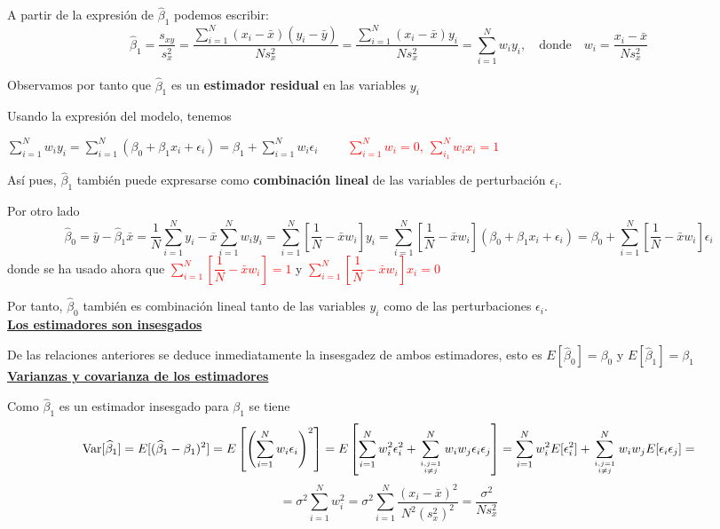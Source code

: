 \documentclass[10pt,a4paper]{book}
\begin{document}
A partir de la expresión de $\widehat{\beta}_1$ podemos escribir: $$\widehat{\beta}_1=\dfrac{s_{xy}}{s^2_x}=\dfrac{\displaystyle\sum^N_{i=1}(x_i-\bar{x})(y_i-\bar{y})}{Ns^2_x}=\dfrac{\displaystyle\sum^N_{i=1}(x_i-\bar{x})y_i}{Ns^2_x}=\displaystyle\sum^N_{i=1}w_iy_i,\quad \mathrm{donde}\quad w_i=\dfrac{x_i-\bar{x}}{Ns^2_x}$$

Observamos por tanto que $\widehat{\beta}_1$ es un \textbf{estimador residual} en las variables $y_i$

Usando la expresión del modelo, tenemos 
\begin{center}
$\displaystyle\sum^N_{i=1}w_iy_i=\displaystyle\sum^N_{i=1}(\beta_0+\beta_1x_i+\epsilon_i)=\beta_1+\displaystyle\sum^N_{i=1}w_i\epsilon_i\qquad$ \textcolor{red}{$\displaystyle\sum^N_{i=1}w_i=0,\: \displaystyle\sum^N_{i_1}w_ix_i=1$}
\end{center}

Así pues, $\widehat{\beta}_1$ también puede expresarse como \textbf{combinación lineal} de las variables de perturbación $\epsilon_i$.

Por otro lado $$\widehat{\beta}_0=\bar{y}-\widehat{\beta}_1\bar{x}=\dfrac{1}{N}\sum^N_{i=1}y_i-\bar{x}\sum^N_{i=1}w_iy_i=\sum^N_{i=1}\left[\dfrac{1}{N}-\bar{x}w_i\right] y_i=\sum^N_{i=1}\left[\dfrac{1}{N}-\bar{x}w_i\right] (\beta_0+\beta_1x_i+\epsilon_i)=\beta_0+\sum^N_{i=1}\left[\dfrac{1}{N}-\bar{x}w_i\right]\epsilon_i$$ donde se ha usado ahora que \textcolor{red}{$\displaystyle\sum^N_{i=1}\left[\dfrac{1}{N}-\bar{x}w_i\right]=1$} y \textcolor{red}{$\displaystyle\sum^N_{i=1}\left[\dfrac{1}{N}-\bar{x}w_i\right]x_i=0$}

Por tanto, $\widehat{\beta}_0$ también es combinación lineal tanto de las variables $y_i$ como de las perturbaciones $\epsilon_i$.
\ \\

\underline{\textbf{Los estimadores son insesgados}}

De las relaciones anteriores se deduce inmediatamente la insesgadez de ambos estimadores, esto es $E[\widehat{\beta}_0]=\beta_0$ y $E[\widehat{\beta}_1]=\beta_1$
\ \\

\underline{\textbf{Varianzas y covarianza de los estimadores}}

Como $\widehat{\beta}_1$ es un estimador insesgado para $\beta_1$ se tiene $$\mathrm{Var}[\widehat{\beta}_1]=E[(\widehat{\beta}_1-\beta_1)^2]=E\left[\left(\sum^N_{i=1}w_i\epsilon_i \right) ^2\right] =E\left[\sum^N_{i=1}w^2_i\epsilon^2_i+\sum^N_{i,j=1\atop i\ne j}w_iw_j\epsilon_i\epsilon_j\right]=\sum^N_{i=1}w_i^2E[\epsilon^2_i]+\sum^N_{i,j=1\atop i\ne j}w_iw_jE[\epsilon_i\epsilon_j]=$$$$=\sigma^2\sum^N_{i=1}w^2_i=\sigma^2\sum^N_{i=1}\dfrac{(x_i-\bar{x})^2}{N^2(s^2_x)^2}=\dfrac{\sigma^2}{Ns^2_x}$$
\end{document}
